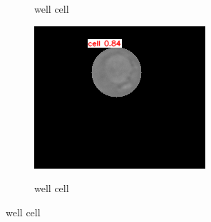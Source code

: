 \begin{figure}[t]
\begin{center}
\begin{subfigure}[b]{0.25\textwidth}
			\label{fig:Out of Focus}
			\caption{well cell}
		\end{subfigure}
		\begin{subfigure}[b]{0.25\textwidth}
			\includegraphics[width=\textwidth]{thesis-template-master/images/bestweightoncell3.png}
			\label{fig:Lighting Artifacts}
			\caption{well cell}
		\end{subfigure}
	

\end{center}
\end{figure}
